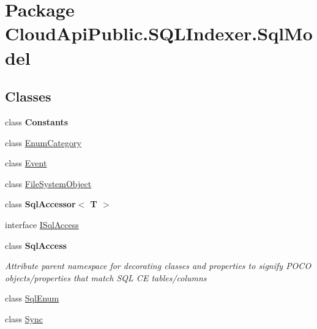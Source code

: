 \hypertarget{namespace_cloud_api_public_1_1_s_q_l_indexer_1_1_sql_model}{\section{Package Cloud\-Api\-Public.\-S\-Q\-L\-Indexer.\-Sql\-Model}
\label{namespace_cloud_api_public_1_1_s_q_l_indexer_1_1_sql_model}
}
\subsection*{Classes}
\begin{DoxyCompactItemize}
\item 
class {\bfseries Constants}
\item 
class \hyperlink{class_cloud_api_public_1_1_s_q_l_indexer_1_1_sql_model_1_1_enum_category}{Enum\-Category}
\item 
class \hyperlink{class_cloud_api_public_1_1_s_q_l_indexer_1_1_sql_model_1_1_event}{Event}
\item 
class \hyperlink{class_cloud_api_public_1_1_s_q_l_indexer_1_1_sql_model_1_1_file_system_object}{File\-System\-Object}
\item 
class {\bfseries Sql\-Accessor$<$ T $>$}
\item 
interface \hyperlink{interface_cloud_api_public_1_1_s_q_l_indexer_1_1_sql_model_1_1_i_sql_access}{I\-Sql\-Access}
\item 
class {\bfseries Sql\-Access}
\begin{DoxyCompactList}\small\item\em Attribute parent namespace for decorating classes and properties to signify P\-O\-C\-O objects/properties that match S\-Q\-L C\-E tables/columns \end{DoxyCompactList}\item 
class \hyperlink{class_cloud_api_public_1_1_s_q_l_indexer_1_1_sql_model_1_1_sql_enum}{Sql\-Enum}
\item 
class \hyperlink{class_cloud_api_public_1_1_s_q_l_indexer_1_1_sql_model_1_1_sync}{Sync}
\end{DoxyCompactItemize}
